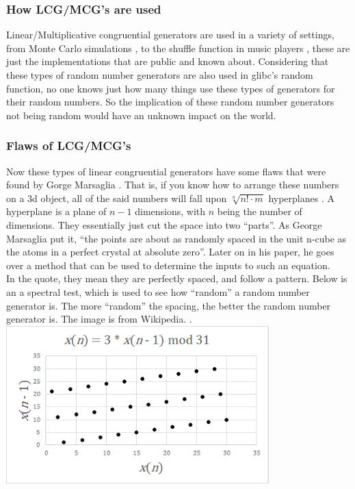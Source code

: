 \documentclass[12pft, english]{article}
\begin{document}
\begin{multicols}{2}
  \subsubsection{How LCG/MCG's are used}
  Linear/Multiplicative congruential generators are used in a variety of settings, from Monte Carlo simulations \citep{fallOntoPlanes}, to the shuffle function in music players \citep{jukSource}, these are just the implementations that are public and known about. Considering that these types of random number generators are also used in glibc's \citep{linuxRNG} random function, no one knows just how many things use these types of generators for their random numbers. So the implication of these random number generators not being random would have an unknown impact on the world.
  \subsubsection{Flaws of LCG/MCG's}
  Now these types of linear congruential generators have some flaws that were found by Gorge Marsaglia \citep{fallOntoPlanes}. That is, if you know how to arrange these numbers on a 3d object, all of the said numbers will fall upon \(\sqrt[n]{{n}! \cdot m}\) hyperplanes \citep{fallOntoPlanes}. A hyperplane is a plane of \(n-1 \) dimensions, with \(n\) being the number of dimensions. They essentially just cut the space into two ``parts''. As George Marsaglia put it, ``the points are about as randomly spaced in the unit n-cube as the atoms in a perfect crystal at absolute zero''. Later on in his paper, he goes over a method that can be used to determine the inputs to such an equation. \\
  In the quote, they mean they are perfectly spaced, and follow a pattern. Below is an a spectral test, which is used to see how ``random'' a random number generator is. The more ``random'' the spacing, the better the random number generator is. The image is from Wikipedia. \citep{wikiSpec}.
  \includegraphics[width=4in]{Spectral_Test}

\end{multicols}
\end{document}
